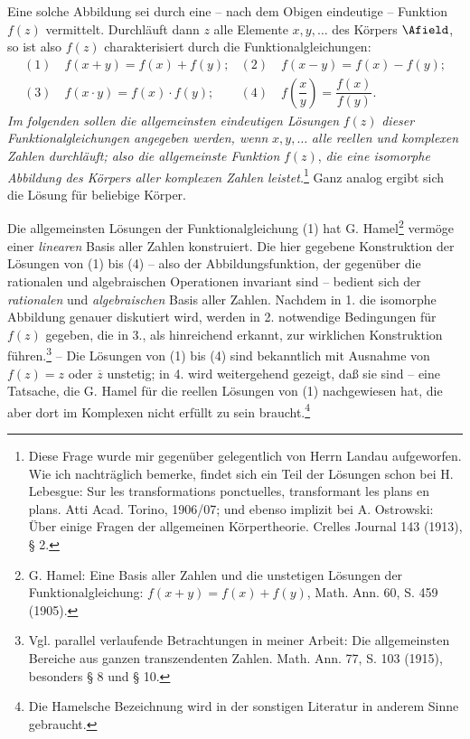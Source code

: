 \documentclass[11pt]{article}
\begin{document}
Eine solche Abbildung sei durch eine -- nach dem Obigen eindeutige -- Funktion \(f(z)\) vermittelt. Durchläuft dann \(z\) alle Elemente \(x,y,\ldots\) des Körpers \(\Afield\), so ist also \(f(z)\) charakterisiert durch die Funktionalgleichungen:
\[
\begin{array}{ll}
(1)\quad f(x+y)=f(x)+f(y); & (2)\quad f(x-y)=f(x)-f(y);\\[0.45em]
(3)\quad f(x\cdot y)=f(x)\cdot f(y); & (4)\quad f\!\left(\dfrac{x}{y}\right)=\dfrac{f(x)}{f(y)}.
\end{array}
\]
\emph{Im folgenden sollen die allgemeinsten eindeutigen Lösungen} \(f(z)\) \emph{dieser Funktionalgleichungen angegeben werden, wenn} \(x,y,\ldots\) \emph{alle reellen und komplexen Zahlen durchläuft; also die allgemeinste Funktion} \(f(z)\), \emph{die eine isomorphe Abbildung des Körpers aller komplexen Zahlen leistet.}\footnote{Diese Frage wurde mir gegenüber gelegentlich von Herrn Landau aufgeworfen. Wie ich nachträglich bemerke, findet sich ein Teil der Lösungen schon bei H. Lebesgue: Sur les transformations ponctuelles, transformant les plans en plans. Atti Acad. Torino, 1906/07; und ebenso implizit bei A. Ostrowski: Über einige Fragen der allgemeinen Körpertheorie. Crelles Journal 143 (1913), § 2.} Ganz analog ergibt sich die Lösung für beliebige Körper.

Die allgemeinsten Lösungen der Funktionalgleichung (1) hat G. Hamel\footnote{G. Hamel: Eine Basis aller Zahlen und die unstetigen Lösungen der Funktionalgleichung: \(f(x+y)=f(x)+f(y)\), Math. Ann. 60, S. 459 (1905).} vermöge einer \emph{linearen} Basis aller Zahlen konstruiert. Die hier gegebene Konstruktion der Lösungen von (1) bis (4) -- also der Abbildungsfunktion, der gegenüber die rationalen und algebraischen Operationen invariant sind -- bedient sich der \emph{rationalen} und \emph{algebraischen} Basis aller Zahlen. Nachdem in 1. die isomorphe Abbildung genauer diskutiert wird, werden in 2. notwendige Bedingungen für \(f(z)\) gegeben, die in 3., als hinreichend erkannt, zur wirklichen Konstruktion führen.\footnote{Vgl. parallel verlaufende Betrachtungen in meiner Arbeit: Die allgemeinsten Bereiche aus ganzen transzendenten Zahlen. Math. Ann. 77, S. 103 (1915), besonders § 8 und § 10.} -- Die Lösungen von (1) bis (4) sind bekanntlich mit Ausnahme von \(f(z)=z\) oder \(\overline z\) unstetig; in 4. wird weitergehend gezeigt, daß sie  sind -- eine Tatsache, die G. Hamel für die reellen Lösungen von (1) nachgewiesen hat, die aber dort im Komplexen nicht erfüllt zu sein braucht.\footnote{Die Hamelsche Bezeichnung  wird in der sonstigen Literatur in anderem Sinne gebraucht.}
\end{document}
